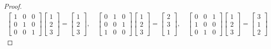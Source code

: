\begin{proof}
    \[
        \begin{split}
            \begin{bmatrix}
                1 & 0 & 0 \\
                0 & 1 & 0 \\
                0 & 0 & 1
            \end{bmatrix}
            \begin{bmatrix}
                1 \\
                2 \\
                3
            \end{bmatrix} =
            \begin{bmatrix}
                1 \\
                2 \\
                3
            \end{bmatrix},\quad
            \begin{bmatrix}
                0 & 1 & 0 \\
                0 & 0 & 1 \\
                1 & 0 & 0
            \end{bmatrix}
            \begin{bmatrix}
                1 \\
                2 \\
                3
            \end{bmatrix} =
            \begin{bmatrix}
                2 \\
                3 \\
                1
            \end{bmatrix},\quad
            \begin{bmatrix}
                0 & 0 & 1 \\
                1 & 0 & 0 \\
                0 & 1 & 0
            \end{bmatrix}
            \begin{bmatrix}
                1 \\
                2 \\
                3
            \end{bmatrix} =
            \begin{bmatrix}
                3 \\
                1 \\
                2

\end{bmatrix}
\end{split}\]
\end{proof}
